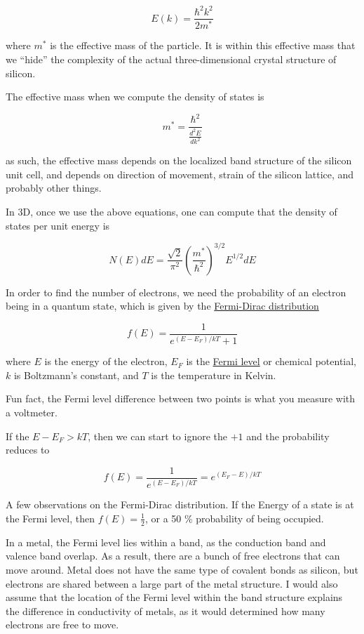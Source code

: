 \[E(k) = \frac{\hbar^2 k^2}{2 m^*}\]

where \(m^*\) is the effective mass of the particle. It is within this
effective mass that we ``hide'' the complexity of the actual
three-dimensional crystal structure of silicon.

The effective mass when we compute the density of states is

\[m^* = \frac{\hbar^2}{\frac{d^2 E}{dk^2}}\]

as such, the effective mass depends on the localized band structure of
the silicon unit cell, and depends on direction of movement, strain of
the silicon lattice, and probably other things.

In 3D, once we use the above equations, one can compute that the density
of states per unit energy is

\[N(E)dE = \frac{\sqrt{2}}{\pi^2}\left(\frac{m^*}{\hbar^2}\right)^{3/2} E^{1/2}dE\]

In order to find the number of electrons, we need the probability of an
electron being in a quantum state, which is given by the
\href{https://en.wikipedia.org/wiki/Fermi–Dirac_statistics}{Fermi-Dirac
distribution}

\[
 f(E) = \frac{1}{e^{(E - E_F)/kT}  + 1}
\tag{2}
\label{eq:fm}
\]

where \(E\) is the energy of the electron, \(E_F\) is the
\href{https://en.wikipedia.org/wiki/Fermi_level}{Fermi level} or
chemical potential, \(k\) is Boltzmann's constant, and \(T\) is the
temperature in Kelvin.

Fun fact, the Fermi level difference between two points is what you
measure with a voltmeter.

If the \(E -E_F > kT\), then we can start to ignore the \(+1\) and the
probability reduces to

\[ f(E) = \frac{1}{e^{(E-E_F)/kT}} = e^{(E_F - E)/kT}\]

A few observations on the Fermi-Dirac distribution. If the Energy of a
state is at the Fermi level, then \(f(E) = \frac{1}{2}\), or a 50 \%
probability of being occupied.

In a metal, the Fermi level lies within a band, as the conduction band
and valence band overlap. As a result, there are a bunch of free
electrons that can move around. Metal does not have the same type of
covalent bonds as silicon, but electrons are shared between a large part
of the metal structure. I would also assume that the location of the
Fermi level within the band structure explains the difference in
conductivity of metals, as it would determined how many electrons are
free to move.

